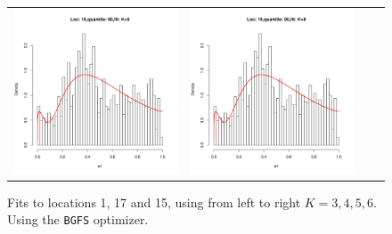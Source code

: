 \begin{figure}[h]
\begin{tabular}{cccc}
\includegraphics[width=\textwidth/4]{../img/loc15/quantile90/fit_K5_BFGS.pdf}
&
\includegraphics[width=\textwidth/4]{../img/loc15/quantile90/fit_K6_BFGS.pdf}\\

\end{tabular}
\caption{Fits to locations 1, 17 and 15, using from left to right $K=3,4,5,6$. Using the \texttt{BGFS} optimizer.}
\label{fig:data_fit_long}
\end{figure}



